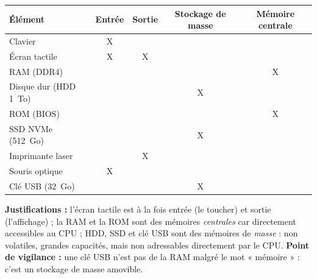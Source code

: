 \documentclass[11pt]{article}
\begin{document}
\begin{corrige}
\begin{center}
\begin{tabular}{|l|c|c|c|c|}
\hline
\rowcolor{popblueL}
\textbf{Élément} & \textbf{Entrée} & \textbf{Sortie} & \textbf{Stockage de masse} & \textbf{Mémoire centrale} \\
\hline
Clavier & X & & & \\
\hline
Écran tactile & X & X & & \\
\hline
RAM (DDR4) & & & & X \\
\hline
Disque dur (HDD \SI{1}{To}) & & & X & \\
\hline
ROM (BIOS) & & & & X \\
\hline
SSD NVMe (\SI{512}{Go}) & & & X & \\
\hline
Imprimante laser & & X & & \\
\hline
Souris optique & X & & & \\
\hline
Clé USB (\SI{32}{Go}) & & & X & \\
\hline
\end{tabular}
\end{center}
\textbf{Justifications :} l'écran tactile est à la fois entrée (le toucher) et sortie (l'affichage) ; la RAM et la ROM sont des mémoires \emph{centrales} car directement accessibles au CPU ; HDD, SSD et clé USB sont des mémoires de \emph{masse} : non volatiles, grandes capacités, mais non adressables directement par le CPU.
\textbf{Point de vigilance :} une clé USB n'est pas de la RAM malgré le mot « mémoire » : c'est un stockage de masse amovible.
\end{corrige}
\end{document}
